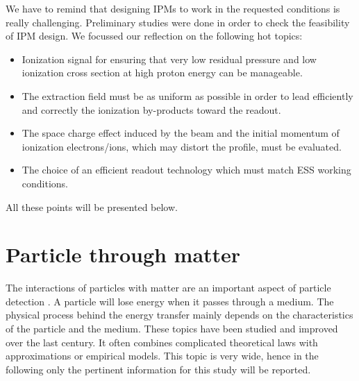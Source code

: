 \begin{refsection}
	We have to remind that designing IPMs to work in the requested conditions is really challenging. Preliminary studies were done in order to check the feasibility of IPM design. We focussed our reflection on the following hot topics:
	\begin{itemize}
		\item Ionization signal for ensuring that very low residual pressure and low ionization cross section at high proton energy can be manageable.
		\item The extraction field must be as uniform as possible in order to lead efficiently and correctly the ionization by-products toward the readout. %
		\item The space charge effect induced by the beam and the initial momentum of ionization electrons/ions, which may distort the profile, must be evaluated.
		\item The choice of an efficient readout technology which must match ESS working conditions.
	\end{itemize}
	All these points will be presented below.


  \section{Particle through matter}
  \label{chap3:sec_particle_in_matter}
	The interactions of particles with matter are an important aspect of particle detection \cite{Knoll2010,Leo1994}. A particle will lose energy when it passes through a medium. The physical process behind the energy transfer mainly depends on the characteristics of the particle and the medium. These topics have been studied and improved over the last century. It often combines complicated theoretical laws with approximations or empirical models. This topic is very wide, hence in the following only the pertinent information for this study will be reported.


\end{refsection}
